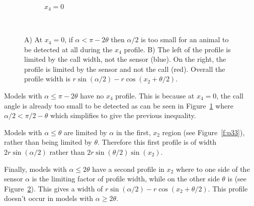 \begin{figure}[t]
        \centering

        \begin{subfigure}[t]{0.4\textwidth}
                \centering
                \caption{$x_4=0$}
                \label{f:p34nox4}
        \end{subfigure}
	~
        \begin{subfigure}[t]{0.4\textwidth}
                \centering
                \caption{}
                \label{f:p34taprof}
        \end{subfigure}
        
\caption{A) At $x_4 = 0$, if $\alpha < \pi - 2\theta$ then $\alpha/2$ is too small for an animal to be detected at all during the $x_4$ profile. B) The left of the profile is limited by the call width, not the sensor (blue). On the right, the profile is limited by the sensor and not the call (red). Overall the profile width is $r\sin(\alpha/2) - r\cos(x_2 + \theta/2)$.     }
\label{f:p34}
\end{figure}

Models with $\alpha \le \pi - 2\theta$  have no $x_4$ profile. This is because at $x_4 = 0$, the call angle is already too small to be detected as can be seen in Figure~\ref{f:p34nox4} where $\alpha/2 < \pi/2 - \theta$ which simplifies to give the previous inequality.

Models with $\alpha \le \theta$ are limited by $\alpha$ in the first, $x_2$ region (see Figure~\ref{f:p33}), rather than being limited by $\theta$. Therefore this first profile is of width $2r\sin(\alpha/2)$ rather than $2r\sin(\theta/2)\sin(x_2)$.

Finally, models with $\alpha \le 2\theta$ have a second profile in $x_2$ where to one side of the sensor $\alpha$ is the limiting factor of profile width, while on the other side $\theta$ is (see Figure~\ref{f:p34taprof}). This gives a width of $r\sin(\alpha/2) - r\cos(x_2 + \theta/2)$. This profile doesn't occur in models with $\alpha \ge 2\theta$.

